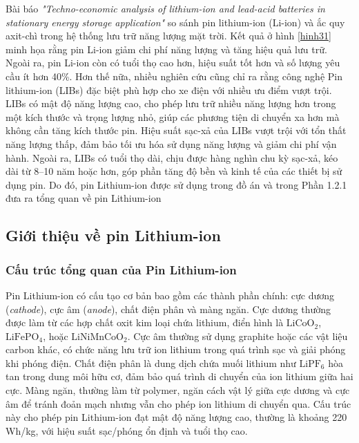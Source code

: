 \documentclass{thesis}
\begin{document}
\newpage
Bài báo \textit{"Techno-economic analysis of lithium-ion and lead-acid batteries in stationary energy storage application"} so sánh pin lithium-ion (Li-ion) và ắc quy axit-chì trong hệ thống lưu trữ năng lượng mặt trời. Kết quả ở hình \ref{hinh31} minh họa rằng pin Li-ion giảm chi phí năng lượng và tăng hiệu quả lưu trữ. Ngoài ra, pin Li-ion còn có tuổi thọ cao hơn, hiệu suất tốt hơn và số lượng yêu cầu ít hơn 40\%.\cite{kebede2021techno}
 Hơn thế nữa, nhiều nghiên cứu cũng chỉ ra rằng công nghệ Pin lithium-ion
 (LIBs) đặc biệt phù hợp cho xe điện với nhiều ưu điểm vượt trội. LIBs có mật độ
 năng lượng cao, cho phép lưu trữ nhiều năng lượng hơn trong một kích thước và trọng
 lượng nhỏ, giúp các phương tiện di chuyển xa hơn mà không cần tăng kích thước pin.
 Hiệu suất sạc-xả của LIBs vượt trội với tổn thất năng lượng thấp, đảm bảo tối ưu hóa
 sử dụng năng lượng và giảm chi phí vận hành. Ngoài ra, LIBs có tuổi thọ dài, chịu
 được hàng nghìn chu kỳ sạc-xả, kéo dài từ 8–10 năm hoặc hơn, góp phần tăng độ bền
 và kinh tế của các thiết bị sử dụng pin. \cite{s2022lithium}\cite{camargos2022perspectives} Do đó, pin Lithium-ion được sử dụng
 trong đồ án và trong Phần 1.2.1 đưa ra tổng quan về pin Lithium-ion








 \newpage
\subsection{Giới thiệu về pin Lithium-ion}
\subsubsection{Cấu trúc tổng quan của Pin Lithium-ion}

Pin Lithium-ion có cấu tạo cơ bản bao gồm các thành phần chính: cực dương (\textit{cathode}), cực âm (\textit{anode}), chất điện phân và màng ngăn. Cực dương thường được làm từ các hợp chất oxit kim loại chứa lithium, điển hình là $\text{LiCoO}_2$, $\text{LiFePO}_4$, hoặc $\text{LiNiMnCoO}_2$. Cực âm thường sử dụng graphite hoặc các vật liệu carbon khác, có chức năng lưu trữ ion lithium trong quá trình sạc và giải phóng khi phóng điện. Chất điện phân là dung dịch chứa muối lithium như $\text{LiPF}_6$ hòa tan trong dung môi hữu cơ, đảm bảo quá trình di chuyển của ion lithium giữa hai cực. Màng ngăn, thường làm từ polymer, ngăn cách vật lý giữa cực dương và cực âm để tránh đoản mạch nhưng vẫn cho phép ion lithium di chuyển qua. Cấu trúc này cho phép pin Lithium-ion đạt mật độ năng lượng cao, thường là khoảng 220 Wh/kg, với hiệu suất sạc/phóng ổn định và tuổi thọ cao.\cite{KULOVA20207242}
\end{document}
